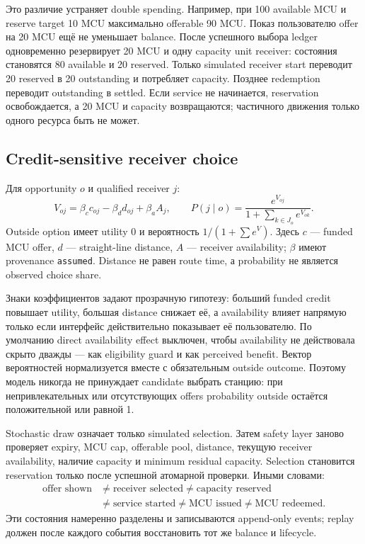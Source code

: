 \documentclass[11pt,a4paper]{article}
\newcommand{\code}[1]{\texttt{#1}}
\begin{document}
Это различие устраняет double spending. Например, при 100 available MCU и reserve target 10 MCU максимально offerable 90 MCU. Показ пользователю offer на 20 MCU ещё не уменьшает balance. После успешного выбора ledger одновременно резервирует 20 MCU и одну capacity unit receiver: состояния становятся 80 available и 20 reserved. Только simulated receiver start переводит 20 reserved в 20 outstanding и потребляет capacity. Позднее redemption переводит outstanding в settled. Если service не начинается, reservation освобождается, а 20 MCU и capacity возвращаются; частичного движения только одного ресурса быть не может.

\subsection{Credit-sensitive receiver choice}
Для opportunity $o$ и qualified receiver $j$:
\[
V_{oj}=\beta_c c_{oj}-\beta_d d_{oj}+\beta_a A_j,
\qquad
P(j\mid o)=\frac{e^{V_{oj}}}{1+\sum_{k\in J_o}e^{V_{ok}}}.
\]
Outside option имеет utility 0 и вероятность $1/(1+\sum e^{V})$. Здесь $c$ --- funded MCU offer, $d$ --- straight-line distance, $A$ --- receiver availability; $\beta$ имеют provenance \code{assumed}. Distance не равен route time, а probability не является observed choice share.

Знаки коэффициентов задают прозрачную гипотезу: больший funded credit повышает utility, большая distance снижает её, а availability влияет напрямую только если интерфейс действительно показывает её пользователю. По умолчанию direct availability effect выключен, чтобы availability не действовала скрыто дважды --- как eligibility guard и как perceived benefit. Вектор вероятностей нормализуется вместе с обязательным outside outcome. Поэтому модель никогда не принуждает candidate выбрать станцию: при непривлекательных или отсутствующих offers probability outside остаётся положительной или равной 1.

Stochastic draw означает только simulated selection. Затем safety layer заново проверяет expiry, MCU cap, offerable pool, distance, текущую receiver availability, наличие capacity и minimum residual capacity. Selection становится reservation только после успешной атомарной проверки. Иными словами:
\[
\begin{aligned}
\text{offer shown}&\ne\text{receiver selected}\ne\text{capacity reserved}\\
&\ne\text{service started}\ne\text{MCU issued}\ne\text{MCU redeemed}.
\end{aligned}
\]
Эти состояния намеренно разделены и записываются append-only events; replay должен после каждого события восстановить тот же balance и lifecycle.
\end{document}
